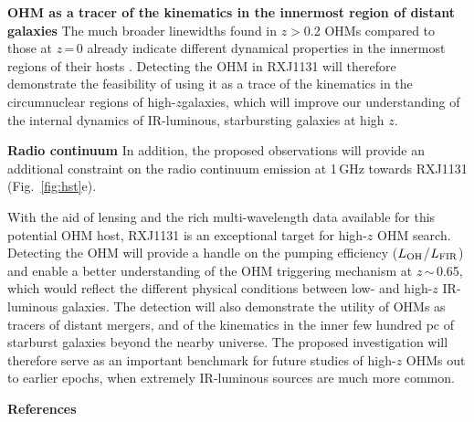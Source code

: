 \documentclass[letterpaper,11pt]{article}
\newcommand{\LFIR}{\mbox{$L_{\rm FIR}$}\xspace}
\newcommand{\LOH}{$L_{\rm OH}$\xspace}
\newcommand{\Fig}[1]{Fig.~\ref{fig:#1}}
\newcommand{\eq}{\,=\,}
\newcommand{\ssim}{\,$\sim$\,}
\newcommand{\highz}{high-$z$\space}
\newcommand{\obs}{observations\xspace}
\begin{document}
{\bf OHM as a tracer of the kinematics in the innermost region of distant galaxies}
The much broader linewidths found in $z$$>$0.2 OHMs compared to those at $z$\eq0 already indicate 
different dynamical properties in the innermost regions of their hosts \citep{Baan92a,Darling02a}.
Detecting the OHM in RXJ1131 will therefore demonstrate the feasibility of 
using it as a trace of the kinematics in the circumnuclear regions of \highz galaxies, which will improve 
our understanding of the internal dynamics of IR-luminous, starbursting galaxies at high $z$.

{\bf Radio continuum}
In addition, the proposed \obs will provide an additional constraint on the radio continuum emission at 1\,GHz 
towards RXJ1131 (\Fig{hst}e).

\noindent 
With the aid of lensing and the rich multi-wavelength data available for this potential OHM host, RXJ1131 is an exceptional target
for high-$z$ OHM search. 
Detecting the OHM will provide a handle on the pumping efficiency (\LOH/\LFIR)
and enable a better understanding of the OHM triggering mechanism at $z$\ssim0.65, which 
would reflect the different physical conditions between low- and high-$z$ IR-luminous galaxies.
The detection will also demonstrate the utility of OHMs as tracers of distant mergers, and
of the kinematics in the inner few hundred pc 
of starburst galaxies beyond the nearby universe. %
The proposed investigation will therefore serve as an
important benchmark for future studies of high-$z$ OHMs out to earlier epochs,
when extremely IR-luminous sources are much more common. 



\noindent \textbf{References}
{\fontsize{10pt}{12pt}\selectfont
    
}
\end{document}
